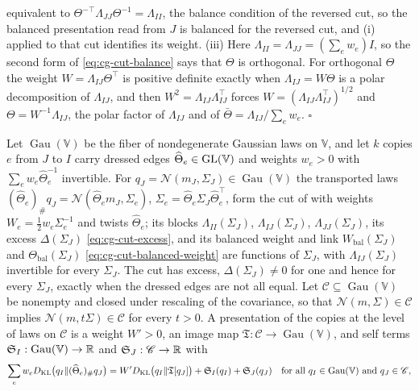 equivalent to $\Theta^{-\top}\Lambda_{JJ}\Theta^{-1}=\Lambda_{II}$, the balance condition of the reversed cut,
so the balanced presentation read from $J$ is balanced for the reversed cut, and (i) applied to that cut
identifies its weight. (iii) Here $\Lambda_{II}=\Lambda_{JJ}=(\sum_ew_e)I$, so the second form of
\eqref{eq:cg-cut-balance} says that $\Theta$ is orthogonal. For orthogonal $\Theta$ the weight
$W=\Lambda_{IJ}\Theta^\top$ is positive definite exactly when $\Lambda_{IJ}=W\Theta$ is a polar decomposition
of $\Lambda_{IJ}$, and then $W^2=\Lambda_{IJ}\Lambda_{IJ}^\top$ forces $W=(\Lambda_{IJ}\Lambda_{IJ}^\top)^{1/2}$ and
$\Theta=W^{-1}\Lambda_{IJ}$, the polar factor of $\Lambda_{IJ}$ and of $\bar\Theta=\Lambda_{IJ}/\sum_ew_e$.
$\square$

Let $\operatorname{Gau}(\mathbb V)$ be the fiber of nondegenerate Gaussian laws on $\mathbb V$, and let $k$ copies $e$ from $J$ to
$I$ carry dressed edges $\widehat\Theta_e\in\mathrm{GL}(\mathbb V)$ and weights $w_e>0$ with $\sum_ew_e\widehat\Theta_e^{-1}$
invertible. For $q_J=\mathcal N(m_J,\Sigma_J)\in\operatorname{Gau}(\mathbb V)$ the transported laws
$(\widehat\Theta_e)_\#q_J=\mathcal N(\widehat\Theta_em_J,\Sigma_e)$, $\Sigma_e=\widehat\Theta_e\Sigma_J\widehat\Theta_e^\top$,
form the cut of  with weights $W_e=\tfrac12w_e\Sigma_e^{-1}$ and twists
$\widehat\Theta_e$; its blocks $\Lambda_{II}(\Sigma_J)$, $\Lambda_{IJ}(\Sigma_J)$, $\Lambda_{JJ}(\Sigma_J)$, its excess
$\Delta(\Sigma_J)$ \eqref{eq:cg-cut-excess}, and its balanced weight and link $W_{\mathrm{bal}}(\Sigma_J)$ and
$\Theta_{\mathrm{bal}}(\Sigma_J)$ \eqref{eq:cg-cut-balanced-weight} are functions of $\Sigma_J$, with
$\Lambda_{IJ}(\Sigma_J)$ invertible for every $\Sigma_J$. The cut has excess, $\Delta(\Sigma_J)\neq0$ for one and
hence for every $\Sigma_J$, exactly when the dressed edges are not all equal. Let $\mathscr C\subseteq\operatorname{Gau}(\mathbb V)$
be nonempty and closed under rescaling of the covariance, so that $\mathcal N(m,\Sigma)\in\mathscr C$ implies
$\mathcal N(m,t\Sigma)\in\mathscr C$ for every $t>0$. A presentation of the copies at the level of laws on
$\mathscr C$ is a weight $W'>0$, an image map $\mathfrak T:\mathscr C\to\operatorname{Gau}(\mathbb V)$, and self terms $\mathfrak S_I:\operatorname{Gau}(\mathbb V)\to\mathbb R$
and $\mathfrak S_J:\mathscr C\to\mathbb R$ with
\begin{equation}
\sum_ew_eD_{\mathrm{KL}}\bigl(q_I\Vert(\widehat\Theta_e)_\#q_J\bigr)=W'D_{\mathrm{KL}}\bigl(q_I\Vert \mathfrak T[q_J]\bigr)+\mathfrak S_I(q_I)+\mathfrak S_J(q_J)
\quad\text{for all }q_I\in\operatorname{Gau}(\mathbb V)\text{ and }q_J\in\mathscr C,
\label{eq:cg-cut-law-presentation}
\end{equation}
